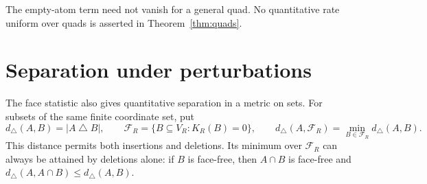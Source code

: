 \documentclass[11pt]{amsart}
\theoremstyle{remark}
\begin{document}
The empty-atom term need not vanish for a general quad. No quantitative rate uniform over quads is asserted in Theorem~\ref{thm:quads}.

\section{Separation under perturbations}\label{sec:perturbations}

The face statistic also gives quantitative separation in a metric on sets. For subsets of the same finite coordinate set, put
\[
 d_\triangle(A,B)=|A\mathbin\triangle B|,\qquad
 \mathcal F_R=\{B\subseteq V_R:K_R(B)=0\},\qquad
 d_\triangle(A,\mathcal F_R)=\min_{B\in\mathcal F_R}d_\triangle(A,B).
\]
This distance permits both insertions and deletions. Its minimum over $\mathcal F_R$ can always be attained by deletions alone: if $B$ is face-free, then $A\cap B$ is face-free and $d_\triangle(A,A\cap B)\le d_\triangle(A,B)$.
\end{document}
